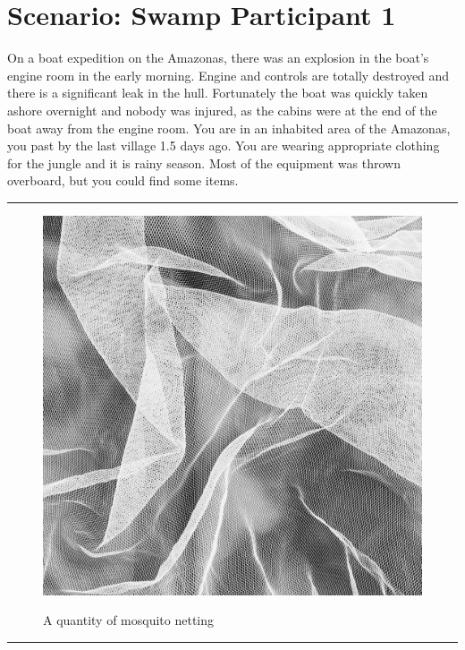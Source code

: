 \documentclass{article}
\begin{document}
    \section*{Scenario: \textmd{Swamp} \hfill Participant \textmd{1}}
    \Large On a boat expedition on the Amazonas, there was an explosion in the boat's engine room in the early morning. Engine and controls are totally destroyed and there is a significant leak in the hull. Fortunately the boat was quickly taken ashore overnight and nobody was injured, as the cabins were at the end of the boat away from the engine room. You are in an inhabited area of the Amazonas, you past by the last village 1.5 days ago. You are wearing appropriate clothing for the jungle and it is rainy season. Most of the equipment was thrown overboard, but you could find some items.\clearpage
        \par\noindent\rule{\textwidth}{0.4pt}
    \begin{figure}[H]
        \centering
        \begin{minipage}{0.25\textwidth}
            \centering
            \includegraphics[width=\textwidth]{../SurvivalItemImages/mosquitonetting}
        \end{minipage}\hfill
        \begin{minipage}{0.7\textwidth}
            \centering
            \Large A quantity of mosquito netting
        \end{minipage}
    \end{figure}
    \vspace{-0.8em}
    \noindent\rule{\textwidth}{0.4pt}
            
\end{document}

